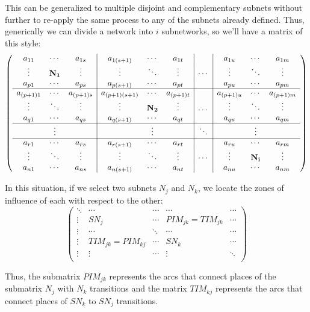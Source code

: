 This can be generalized to multiple disjoint and complementary subnets without further to re-apply the same process to any of the subnets already defined. Thus, generically we can divide a network into $ i $ subnetworks, so we'll have a matrix of this style:
\[
\left(\begin{array}{ccc|ccc|c|ccc}
a_{11} & \cdots & a_{1s} & a_{1(s+1)} & \cdots & a_{1t} &  & a_{1u} & \cdots & a_{1m}\\
\vdots & \mathbf{N_1} & \vdots & \vdots & \ddots & \vdots & \cdots & \vdots & \ddots & \vdots\\
a_{p1} & \cdots & a_{ps} & a_{p(s+1)} & \cdots & a_{pt} &  & a_{pu} & \cdots & a_{pm}\\
\cline{1-10}a_{(p+1)1} & \cdots & a_{(p+1)s} & a_{(p+1)(s+1)} & \cdots & a_{(p+1)t} &  & a_{(p+1)u} & \cdots & a_{(p+1)m}\\
\vdots & \ddots & \vdots & \vdots & \mathbf{N_2} & \vdots & \dots & \vdots & \ddots & \vdots\\
a_{q1} & \cdots & a_{qs} & a_{q(s+1)} & \cdots & a_{qt} &  & a_{qu} & \cdots & a_{qm}\\
\cline{1-10} & \vdots &  &  & \vdots &  & \ddots &  & \vdots\\
\cline{1-10}a_{r1} & \cdots & a_{rs} & a_{r(s+1)} & \cdots & a_{rt} &  & a_{ru} & \cdots & a_{rm}\\
\vdots & \ddots & \vdots & \vdots & \ddots & \vdots & \cdots & \vdots & \mathbf{N_i} & \vdots\\
a_{n1} & \cdots & a_{ns} & a_{n(s+1)} & \cdots & a_{nt} &  & a_{nu} & \cdots & a_{nm}
\end{array}\right)
\]

In this situation, if we select two subnets $ N_ {j} $ and $ N_ {k} $,
we locate the zones of influence of each with respect to the other:
\[
\left(
\begin{array}{c|c|c|c|c}
\ddots & \cdots & \cdots & \cdots & \cdots \\
\hline
\vdots & SN_j & \cdots & PIM_{jk}=TIM_{jk} & \cdots \\
\hline
\vdots & \cdots & \ddots & \cdots & \cdots \\
\hline
\vdots & TIM_{jk}=PIM_{kj} & \cdots & SN_k & \cdots \\
\hline
\vdots & \vdots & \cdots & \vdots & \ddots \\
\end{array}
\right)
\]


Thus, the submatrix $ PIM_{jk} $ represents the arcs that connect places of the submatrix $ N_ {j} $ with $ N_k$ transitions and the matrix $ TIM_{kj} $ represents the arcs that connect places of $ SN_ {k} $ to $ SN_j$ transitions.

